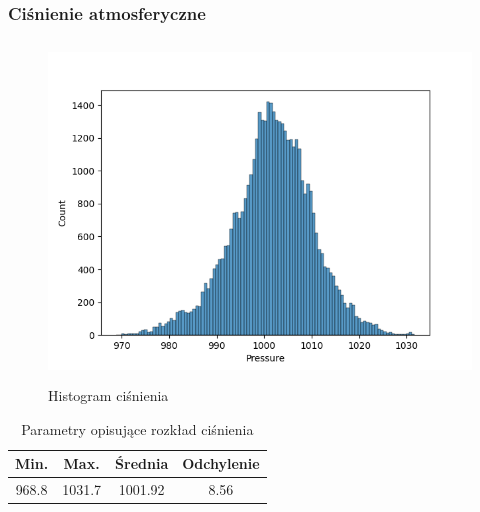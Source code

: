\documentclass[18pt, letterpaper]{article}
\begin{document}
\subsubsection{Ciśnienie atmosferyczne}
\begin{figure}[H]
\centering
\includegraphics[width=120mm, height=90mm]{visualisations/histograms/Pressure_hist.png}
\caption{Histogram ciśnienia}
\end{figure}
\begin{table}[H]
\centering
\begin{tabular}{|c|c|c|c|}
\hline
Min.  & Max. & Średnia & Odchylenie \\ \hline
968.8 & 1031.7 & 1001.92   & 8.56      \\ \hline
\end{tabular}
\caption{Parametry opisujące rozkład ciśnienia}
\end{table}
\end{document}
